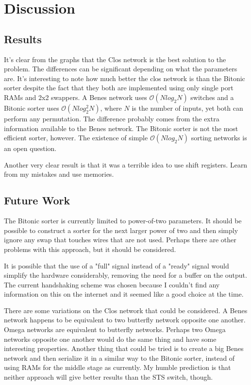 \documentclass[
	utf8,
	largesmallcaps,
	intlimits,
	widermath,
	sharecounter,
	nobreak,
	definition=marks,
	numbers,
	noparts
]{rtthesis}
\begin{document}

\chapter{Discussion}

\section{Results}

It's clear from the graphs that the Clos network is the best solution to the
problem. The differences can be significant depending on what the parameters
are. It's interesting to note how much better the clos network is than the
Bitonic sorter despite the fact that they both are implemented using only
single port RAMs and 2x2 swappers. A Benes network uses $\mathcal{O}(N
log_2{N})$ switches and a Bitonic sorter uses $\mathcal{O}(N log_2^2 N)$, where
$N$ is the number of inputs, yet both can perform any permutation. The
difference probably comes from the extra information available to the Benes
network. The Bitonic sorter is not the most efficient sorter, however. The
existence of simple $\mathcal{O}(N log_2 N)$ sorting networks is an open
question.

Another very clear result is that it was a terrible idea to use shift
registers. Learn from my mistakes and use memories.

\section{Future Work}

The Bitonic sorter is currently limited to power-of-two parameters. It should
be possible to construct a sorter for the next larger power of two and then
simply ignore any swap that touches wires that are not used. Perhaps there are
other problems with this approach, but it should be considered.

It is possible that the use of a "full" signal instead of a "ready" signal
would simplify the hardware considerably, removing the need for a buffer on the
output. The current handshaking scheme was chosen because I couldn't find any
information on this on the internet and it seemed like a good choice at the
time.

There are some variations on the Clos network that could be considered. A Benes
network happens to be equivalent to two butterfly network opposite one another.
Omega networks are equivalent to butterfly networks. Perhaps two Omega networks
opposite one another would do the same thing and have some interesting
properties.
Another thing that could be tried is to create a big Benes network and then
serialize it in a similar way to the Bitonic sorter, instead of using RAMs for
the middle stage as currently. My humble prediction is that neither approach
will give better results than the STS switch, though.
\end{document}
